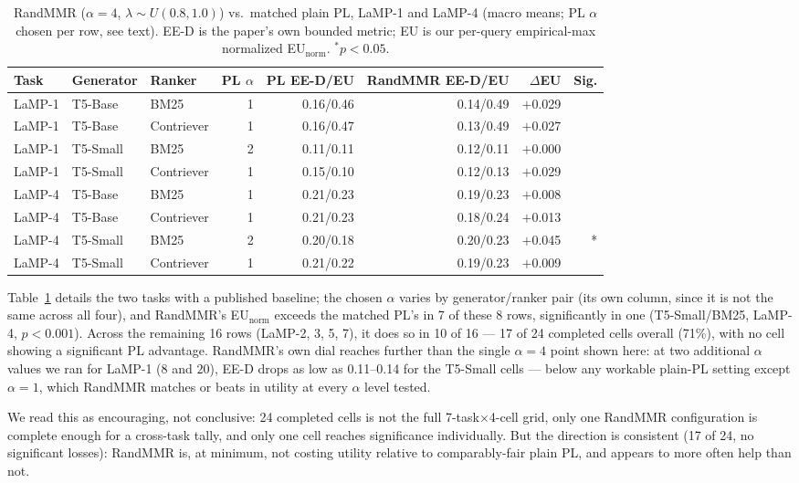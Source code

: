 \documentclass[10pt,twocolumn]{article}
\begin{document}
\begin{table}[t]
\centering
\small
\caption{RandMMR ($\alpha{=}4$, $\lambda\sim U(0.8,1.0)$) vs.\ matched plain PL, LaMP-1
and LaMP-4 (macro means; PL $\alpha$ chosen per row, see text). EE-D is the paper's
own bounded metric; EU is our per-query empirical-max normalized EU$_{\text{norm}}$.
$^*p{<}0.05$.}
\label{tab:hybrid}
\begin{tabular}{@{}lllrrrrr@{}}
\toprule
Task & Generator & Ranker & PL $\alpha$ & PL EE-D/EU & RandMMR EE-D/EU & $\Delta$EU & Sig. \\
\midrule
LaMP-1 & T5-Base  & BM25       & 1 & 0.16/0.46 & 0.14/0.49 & $+$0.029 & \\
LaMP-1 & T5-Base  & Contriever & 1 & 0.16/0.47 & 0.13/0.49 & $+$0.027 & \\
LaMP-1 & T5-Small & BM25       & 2 & 0.11/0.11 & 0.12/0.11 & $+$0.000 & \\
LaMP-1 & T5-Small & Contriever & 1 & 0.15/0.10 & 0.12/0.13 & $+$0.029 & \\
LaMP-4 & T5-Base  & BM25       & 1 & 0.21/0.23 & 0.19/0.23 & $+$0.008 & \\
LaMP-4 & T5-Base  & Contriever & 1 & 0.21/0.23 & 0.18/0.24 & $+$0.013 & \\
LaMP-4 & T5-Small & BM25       & 2 & 0.20/0.18 & 0.20/0.23 & $+$0.045 & * \\
LaMP-4 & T5-Small & Contriever & 1 & 0.21/0.22 & 0.19/0.23 & $+$0.009 & \\
\bottomrule
\end{tabular}
\end{table}

Table~\ref{tab:hybrid} details the two tasks with a published baseline; the chosen
$\alpha$ varies by generator/ranker pair (its own column, since it is not the same
across all four), and RandMMR's EU$_{\text{norm}}$ exceeds the matched PL's in 7 of
these 8 rows, significantly in one (T5-Small/BM25, LaMP-4, $p{<}0.001$). Across the
remaining 16 rows (LaMP-2, 3, 5, 7), it does so in 10 of 16 --- 17 of 24 completed
cells overall (71\%), with no cell showing a significant PL advantage. RandMMR's own
dial reaches further than the single $\alpha{=}4$ point shown here: at two additional
$\alpha$ values we ran for LaMP-1 ($8$ and $20$), EE-D drops as low as 0.11--0.14 for
the T5-Small cells --- below any workable plain-PL setting except $\alpha{=}1$, which
RandMMR matches or beats in utility at every $\alpha$ level tested.

We read this as encouraging, not conclusive: 24 completed cells is not the full
7-task$\times$4-cell grid, only one RandMMR configuration is complete enough for a
cross-task tally, and only one cell reaches significance individually. But the
direction is consistent (17 of 24, no significant losses): RandMMR is, at minimum,
not costing utility relative to comparably-fair plain PL, and appears to more often
help than not.
\end{document}
